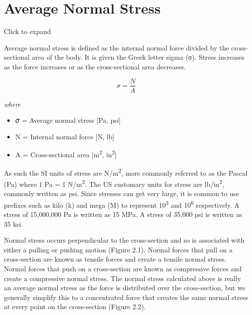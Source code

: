\documentclass[
  letterpaper,
  DIV=11,
  numbers=noendperiod]{scrreprt}
\begin{document}
\section{Average Normal Stress}\label{sec-2.1}

Click to expand

Average normal stress is defined as the internal normal force divided by
the cross-sectional area of the body. It is given the Greek letter sigma
(σ). Stress increases as the force increases or as the cross-sectional
area decreases.

\[
\sigma=\frac{N}{A}
\]

\emph{where}

\begin{itemize}
\item
  𝜎 = Average normal stress {[}Pa, psi{]}
\item
  N = Internal normal force {[}N, lb{]}
\item
  A = Cross-sectional area {[}m\textsuperscript{2},
  in\textsuperscript{2}{]}
\end{itemize}

As such the SI units of stress are N/m\textsuperscript{2}, more commonly
referred to as the Pascal (Pa) where 1 Pa = 1 N/m\textsuperscript{2}.
The US customary units for stress are lb/in\textsuperscript{2}, commonly
written as psi. Since stresses can get very large, it is common to use
prefixes such as kilo (k) and mega (M) to represent
10\textsuperscript{3} and 10\textsuperscript{6} respectively. A stress
of 15,000,000 Pa is written as 15 MPa. A stress of 35,000 psi is written
as 35 ksi.

Normal stress occurs perpendicular to the cross-section and so is
associated with either a pulling or pushing motion (Figure 2.1). Normal
forces that pull on a cross-section are known as tensile forces and
create a tensile normal stress. Normal forces that push on a
cross-section are known as compressive forces and create a compressive
normal stress. The normal stress calculated above is really an average
normal stress as the force is distributed over the cross-section, but we
generally simplify this to a concentrated force that creates the same
normal stress at every point on the cross-section (Figure 2.2).
\end{document}
